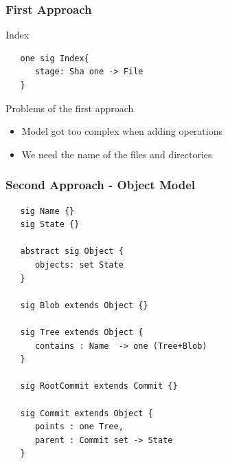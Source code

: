 \documentclass{beamer}
\begin{document}
\begin{frame}[fragile]
   \frametitle{First Approach}
   \begin{block}{Index}
   \footnotesize
   \begin{lstlisting}
   one sig Index{
      stage: Sha one -> File
   }
   \end{lstlisting}
   \end{block}
   \begin{block}{Problems of the first approach}
      \begin{itemize}
         \item Model got too complex when adding operations
         \item We need the name of the files and directories
      \end{itemize}
   \end{block}
\end{frame}


\begin{frame}[fragile]
   \frametitle{Second Approach - Object Model}
   \footnotesize
   \begin{lstlisting}
   sig Name {}
   sig State {}

   abstract sig Object {
      objects: set State
   }

   sig Blob extends Object {}

   sig Tree extends Object {
      contains : Name  -> one (Tree+Blob)
   }
   
   sig RootCommit extends Commit {}

   sig Commit extends Object {
      points : one Tree,
      parent : Commit set -> State
   }

   \end{lstlisting}
%

\end{frame}
\end{document}
